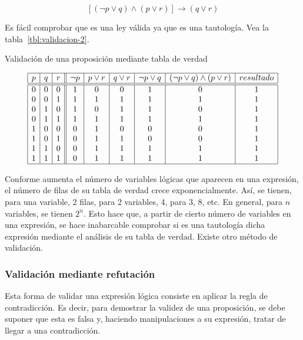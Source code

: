 $$ [(\neg p \lor q) \land (p \lor r)] \to (q \lor r) $$

\noindent Es fácil comprobar que es una ley válida ya que es una tautología.
Vea la tabla~\ref{tbl:validacion-2}.

\begin{table}%
  \caption{Validación de una proposición mediante tabla de verdad}
  \label{tbl:validacion-2}
  \centering
  $$
    \begin{array}{|c|c|c||c|c|c|c|c|c|}
      \hline
      p & q & r & \neg p & p \lor r & q \lor r & \neg p \lor q
        & (\neg p \lor q) \land (p \lor r) & resultado \\
      \hline
      \hline
      0 & 0 & 0 & 1 & 0 & 0 & 1 & 0 & 1 \\
      0 & 0 & 1 & 1 & 1 & 1 & 1 & 1 & 1 \\
      0 & 1 & 0 & 1 & 0 & 1 & 1 & 0 & 1 \\
      0 & 1 & 1 & 1 & 1 & 1 & 1 & 1 & 1 \\
      1 & 0 & 0 & 0 & 1 & 0 & 0 & 0 & 1 \\
      1 & 0 & 1 & 0 & 1 & 1 & 0 & 0 & 1 \\
      1 & 1 & 0 & 0 & 1 & 1 & 1 & 1 & 1 \\
      1 & 1 & 1 & 0 & 1 & 1 & 1 & 1 & 1 \\
      \hline
    \end{array}
  $$
\end{table}

Conforme aumenta el número de variables lógicas que aparecen en una
expresión, el número de filas de su tabla de verdad crece exponencialmente.
Así, se tienen, para una variable, 2 filas, para 2 variables, 4, para 3, 8,
etc. En general, para $n$ variables, se tienen $2^n$. Esto hace que, a
partir de cierto número de variables en una expresión, se hace inabarcable
comprobar si es una tautología dicha expresión mediante el análisis de su
tabla de verdad. Existe otro método de validación.




\subsubsection{Validación mediante refutación}

Esta forma de validar una expresión lógica consiste en aplicar la regla de
contradicción. Es decir, para demostrar la validez de una proposición, se
debe suponer que esta es falsa y, haciendo manipulaciones a su expresión,
tratar de llegar a una contradicción.

